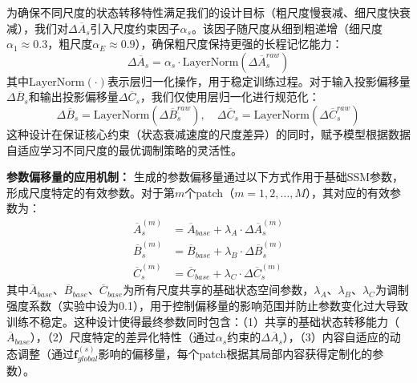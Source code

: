 \documentclass[preprint,12pt]{elsarticle}
\begin{document}
为确保不同尺度的状态转移特性满足我们的设计目标（粗尺度慢衰减、细尺度快衰减），我们对$\Delta\overline{A}_s$引入尺度约束因子$\alpha_s$。该因子随尺度从细到粗递增（细尺度$\alpha_1 \approx 0.3$，粗尺度$\alpha_E \approx 0.9$），确保粗尺度保持更强的长程记忆能力：
\begin{equation}
	\Delta\overline{A}_s = \alpha_s \cdot \text{LayerNorm}(\Delta\overline{A}_s^{raw})
\end{equation}
其中$\text{LayerNorm}(\cdot)$表示层归一化操作，用于稳定训练过程。对于输入投影偏移量$\Delta\overline{B}_s$和输出投影偏移量$\Delta\overline{C}_s$，我们仅使用层归一化进行规范化：
\begin{equation}
	\Delta\overline{B}_s = \text{LayerNorm}(\Delta\overline{B}_s^{raw}), \quad
	\Delta\overline{C}_s = \text{LayerNorm}(\Delta\overline{C}_s^{raw})
\end{equation}
这种设计在保证核心约束（状态衰减速度的尺度差异）的同时，赋予模型根据数据自适应学习不同尺度的最优调制策略的灵活性。

\textbf{参数偏移量的应用机制：}
生成的参数偏移量通过以下方式作用于基础SSM参数，形成尺度特定的有效参数。对于第$m$个patch（$m = 1, 2, \ldots, M$），其对应的有效参数为：
\begin{equation}
	\begin{aligned}
		\overline{A}_s^{(m)} &= \overline{A}_{base} + \lambda_A \cdot \Delta\overline{A}_s^{(m)} \\
		\overline{B}_s^{(m)} &= \overline{B}_{base} + \lambda_B \cdot \Delta\overline{B}_s^{(m)} \\
		\overline{C}_s^{(m)} &= \overline{C}_{base} + \lambda_C \cdot \Delta\overline{C}_s^{(m)}
	\end{aligned}
	\label{eq:param_modulation}
\end{equation}
其中$\overline{A}_{base}$、$\overline{B}_{base}$、$\overline{C}_{base}$为所有尺度共享的基础状态空间参数，$\lambda_A$、$\lambda_B$、$\lambda_C$为调制强度系数（实验中设为0.1），用于控制偏移量的影响范围并防止参数变化过大导致训练不稳定。这种设计使得最终参数同时包含：（1）共享的基础状态转移能力（$\overline{A}_{base}$），（2）尺度特定的差异化特性（通过$\alpha_s$约束的$\Delta\overline{A}_s$），（3）内容自适应的动态调整（通过$\mathbf{f}_{global}^{(s)}$影响的偏移量，每个patch根据其局部内容获得定制化的参数）。
\end{document}
